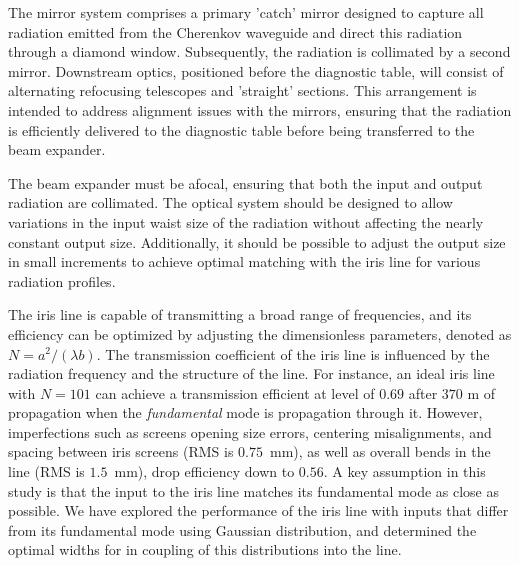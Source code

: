     The mirror system comprises a primary 'catch' mirror designed to capture all radiation emitted from the Cherenkov waveguide and direct this radiation through a diamond window. Subsequently, the radiation is collimated by a second mirror. Downstream optics, positioned before the diagnostic table, will consist of alternating refocusing telescopes and 'straight' sections. This arrangement is intended to address alignment issues with the mirrors, ensuring that the radiation is efficiently delivered to the diagnostic table before being transferred to the beam expander.
    
    The beam expander must be afocal, ensuring that both the input and output radiation are collimated. The optical system should be designed to allow variations in the input waist size of the radiation without affecting the nearly constant output size. Additionally, it should be possible to adjust the output size in small increments to achieve optimal matching with the iris line for various radiation profiles.
    
    The iris line is capable of transmitting a broad range of frequencies, and its efficiency can be optimized by adjusting the dimensionless parameters, denoted as $N = a^2/(\lambda b)$. The transmission coefficient of the iris line is influenced by the radiation frequency and the structure of the line. For instance, an ideal iris line with $N = 101$ can achieve a transmission efficient at level of $0.69$ after $370$ m of propagation when the \textit{fundamental} mode is propagation through it. However, imperfections such as screens opening size errors, centering misalignments, and spacing between iris screens (RMS is $0.75$~mm), as well as overall bends in the line (RMS is $1.5$~mm), drop efficiency down to $0.56$. A key assumption in this study is that the input to the iris line matches its fundamental mode as close as possible. We have explored the performance of the iris line with inputs that differ from its fundamental mode using Gaussian distribution, and determined the optimal widths for in coupling of this distributions into the line. 
    